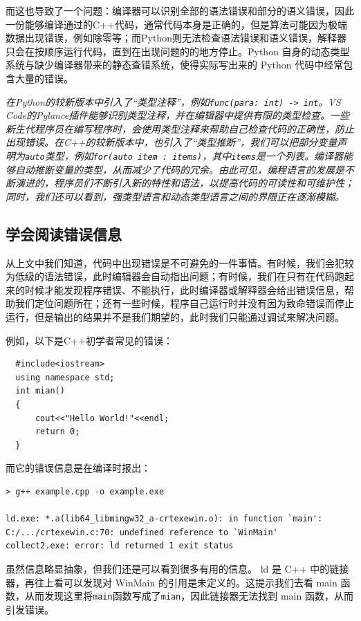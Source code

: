 \documentclass[../main.tex]{subfiles}
\begin{document}
而这也导致了一个问题：编译器可以识别全部的语法错误和部分的语义错误，因此一份能够编译通过的C++代码，通常代码本身是正确的，但是算法可能因为极端数据出现错误，例如除零等；而Python则无法检查语法错误和语义错误，解释器只会在按顺序运行代码，直到在出现问题的的地方停止。Python 自身的动态类型系统与缺少编译器带来的静态查错系统，使得实际写出来的 Python 代码中经常包含大量的错误。

\emph{在Python的较新版本中引入了“类型注释”，例如\texttt{func(para: int) -> int}。VS Code的Pylance插件能够识别类型注释，并在编辑器中提供有限的类型检查。一些新生代程序员在编写程序时，会使用类型注释来帮助自己检查代码的正确性，防止出现错误。在C++的较新版本中，也引入了“类型推断”，我们可以把部分变量声明为\texttt{auto}类型，例如\texttt{for(auto item : items)}，其中\texttt{items}是一个列表。编译器能够自动推断变量的类型，从而减少了代码的冗余。由此可见，编程语言的发展是不断演进的，程序员们不断引入新的特性和语法，以提高代码的可读性和可维护性；同时，我们还可以看到，强类型语言和动态类型语言之间的界限正在逐渐模糊。}

\subsection{学会阅读错误信息}

从上文中我们知道，代码中出现错误是不可避免的一件事情。有时候，我们会犯较为低级的语法错误，此时编辑器会自动指出问题；有时候，我们在只有在代码跑起来的时候才能发现程序错误、不能执行，此时编译器或解释器会给出错误信息，帮助我们定位问题所在；还有一些时候，程序自己运行时并没有因为致命错误而停止运行，但是输出的结果并不是我们期望的，此时我们只能通过调试来解决问题。

例如，以下是C++初学者常见的错误：

\begin{verbatim}
  #include<iostream>
  using namespace std;
  int mian()
  {
      cout<<"Hello World!"<<endl;
      return 0;
  }
\end{verbatim}

而它的错误信息是在编译时报出：

\begin{verbatim}
> g++ example.cpp -o example.exe

ld.exe: *.a(lib64_libmingw32_a-crtexewin.o): in function `main':
C:/.../crtexewin.c:70: undefined reference to `WinMain'
collect2.exe: error: ld returned 1 exit status
\end{verbatim}

虽然信息略显抽象，但我们还是可以看到很多有用的信息。 ld 是 C++ 中的链接器，再往上看可以发现对 WinMain 的引用是未定义的。这提示我们去看 main 函数，从而发现这里将\texttt{main}函数写成了\texttt{mian}，因此链接器无法找到 main 函数，从而引发错误。
\end{document}
